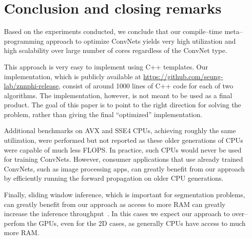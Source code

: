 \section{Conclusion and closing remarks}

  Based on the experiments conducted, we conclude that our
  compile--time meta--programming approach to optimize ConvNets yields
  very high utilization and high scalability over large number of
  cores regardless of the ConvNet type.

  This approach is very easy to implement using C++ templates.  Our
  implementation, which is publicly available at
  \url{https://github.com/seung-lab/znnphi-release}, consist of around
  1000 lines of C++ code for each of two algorithms. The
  implementation, however, is not meant to be used as a final product.
  The goal of this paper is to point to the right direction for
  solving the problem, rather than giving the final ``optimized''
  implementation.

  Additional benchmarks on AVX and SSE4 CPUs, achieving roughly the
  same utilization, were performed but not reported as these older
  generations of CPUs were capable of much less FLOPS.  In practice,
  such CPUs would never be used for training ConvNets.  However,
  consumer applications that use already trained ConvNets, such as
  image processing apps, can greatly benefit from our approach by
  efficiently running the forward propagation on older CPU
  generations.

  Finally, sliding window inference, which is important for
  segmentation problems, can greatly benefit from our approach as
  access to more RAM can greatly increase the inference
  throughput~\cite{zlateski2016znni}.  In this cases we expect our
  approach to over--perfom the GPUs, even for the 2D cases, as
  generally CPUs have access to much more RAM.

